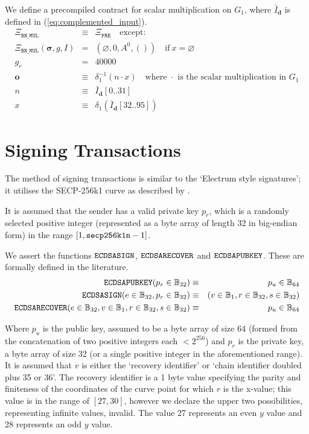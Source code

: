 \documentclass[9pt,oneside]{amsart}
\begin{document}
We define a precompiled contract for scalar multiplication on $G_1$, where $\bar I_{\mathbf d}$ is defined in (\ref{eq:complemented_input}).
\begin{eqnarray}
\Xi_{\mathtt{BN\_MUL}}&\equiv&\Xi_{\mathtt{PRE}}\quad\text{except:}\\
\Xi_{\mathtt{BN\_MUL}}(\boldsymbol\sigma,g,I)&=&(\varnothing,0,A^0,())\quad\text{if}\ x=\varnothing\\
g_r &=& 40000\\
\mathbf o&\equiv&\delta_1^{-1}(n\cdot x)\quad\text{where $\cdot$ is the scalar multiplication in $G_1$}\\
n&\equiv&\bar I_{\mathbf d}[0..31]\\
x&\equiv&\delta_1(\bar I_{\mathbf d}[32..95])
\end{eqnarray}

\section{Signing Transactions}\label{app:signing}

The method of signing transactions is similar to the `Electrum style signatures'; it utilises the SECP-256k1 curve as described by \cite{gura2004comparing}.

It is assumed that the sender has a valid private key $p_r$, which is a randomly selected positive integer (represented as a byte array of length 32 in big-endian form) in the range \hbox{$[1, \mathtt{\tiny secp256k1n} - 1]$}.

We assert the functions $\mathtt{\small ECDSASIGN}$, $\mathtt{\small ECDSARECOVER}$ and $\mathtt{\small ECDSAPUBKEY}$. These are formally defined in the literature.
\begin{eqnarray}
\mathtt{\small ECDSAPUBKEY}(p_r \in \mathbb{B}_{32}) & \equiv & p_u \in \mathbb{B}_{64} \\
\mathtt{\small ECDSASIGN}(e \in \mathbb{B}_{32}, p_r \in \mathbb{B}_{32}) & \equiv & (v \in \mathbb{B}_{1}, r \in \mathbb{B}_{32}, s \in \mathbb{B}_{32}) \\
\mathtt{\small ECDSARECOVER}(e \in \mathbb{B}_{32}, v \in \mathbb{B}_{1}, r \in \mathbb{B}_{32}, s \in \mathbb{B}_{32}) & \equiv & p_u \in \mathbb{B}_{64}
\end{eqnarray}

Where $p_u$ is the public key, assumed to be a byte array of size 64 (formed from the concatenation of two positive integers each $< 2^{256}$) and $p_r$ is the private key, a byte array of size 32 (or a single positive integer in the aforementioned range). It is assumed that $v$ is either the `recovery identifier' or `chain identifier doubled plus 35 or 36'. The recovery identifier is a 1 byte value specifying the parity and finiteness of the coordinates of the curve point for which $r$ is the x-value; this value is in the range of $[27, 30]$, however we declare the upper two possibilities, representing infinite values, invalid. The value 27 represents an even $y$ value and 28 represents an odd $y$ value.
\end{document}

